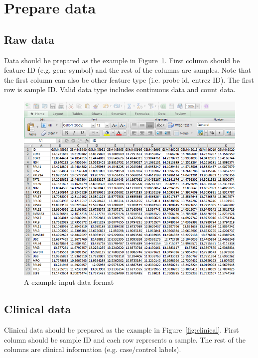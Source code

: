 
\section{Prepare data}
\label{sec:dataPrepare}
\subsection{Raw data}

Data should be prepared as the example in Figure~\ref{fig:dataMicroarray}.
First column should be feature ID (e.g. gene symbol) and the rest of the columns are samples.
Note that the first column can also be other feature type (i.e. probe id, entrez ID).
The first row is sample ID.
Valid data type includes continuous data and count data.

\begin{figure}[H]
\begin{center}
\includegraphics[scale=0.5]{./figure/dataPreparation/dataMicroarray}
\caption{A example input data format}
\label{fig:dataMicroarray}
\end{center}
\end{figure}

\subsection{Clinical data}

Clinical data should be prepared as the example in Figure~\ref{fig:clinical}.
First column should be sample ID and each row represents a sample.
The rest of the columns are clinical information (e.g. case/control labels).

